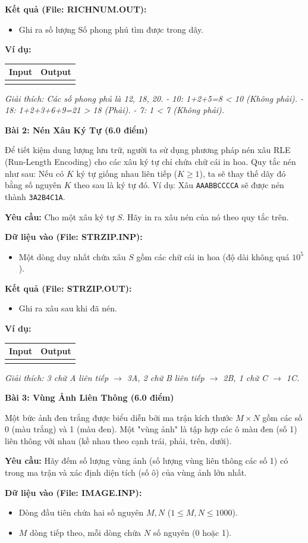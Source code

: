 \documentclass[11pt, a4paper]{article}
\newcommand{\bai}[2]{\vspace{0.5cm}\noindent\textbf{Bài #1: #2}}
\newcommand{\iobox}[2]{
    \begin{center}
    \begin{tabularx}{0.8\textwidth}{|X|X|}
    \hline
    \textbf{Input} & \textbf{Output} \\
    \hline
    \vtop{#1} & \vtop{#2} \\
    \hline
    \end{tabularx}
    \end{center}
}
\begin{document}
\textbf{Kết quả (File: RICHNUM.OUT):}
\begin{itemize}
    \item Ghi ra số lượng Số phong phú tìm được trong dãy.
\end{itemize}

\textbf{Ví dụ:}
\iobox{
5 \newline
12 10 18 20 7
}{
3
}
\textit{Giải thích: Các số phong phú là 12, 18, 20.
- 10: 1+2+5=8 < 10 (Không phải).
- 18: 1+2+3+6+9=21 > 18 (Phải).
- 7: 1 < 7 (Không phải).}

\bai{2}{Nén Xâu Ký Tự (6.0 điểm)}

Để tiết kiệm dung lượng lưu trữ, người ta sử dụng phương pháp nén xâu RLE (Run-Length Encoding) cho các xâu ký tự chỉ chứa chữ cái in hoa. Quy tắc nén như sau: Nếu có $K$ ký tự giống nhau liên tiếp ($K \ge 1$), ta sẽ thay thế dãy đó bằng số nguyên $K$ theo sau là ký tự đó.
Ví dụ: Xâu \texttt{AAABBCCCCA} sẽ được nén thành \texttt{3A2B4C1A}.

\textbf{Yêu cầu:} Cho một xâu ký tự $S$. Hãy in ra xâu nén của nó theo quy tắc trên.

\textbf{Dữ liệu vào (File: STRZIP.INP):}
\begin{itemize}
    \item Một dòng duy nhất chứa xâu $S$ gồm các chữ cái in hoa (độ dài không quá $10^5$).
\end{itemize}

\textbf{Kết quả (File: STRZIP.OUT):}
\begin{itemize}
    \item Ghi ra xâu sau khi đã nén.
\end{itemize}

\textbf{Ví dụ:}
\iobox{
AAABBC
}{
3A2B1C
}
\textit{Giải thích: 3 chữ A liên tiếp $\to$ 3A, 2 chữ B liên tiếp $\to$ 2B, 1 chữ C $\to$ 1C.}

\newpage

\bai{3}{Vùng Ảnh Liên Thông (6.0 điểm)}

Một bức ảnh đen trắng được biểu diễn bởi ma trận kích thước $M \times N$ gồm các số 0 (màu trắng) và 1 (màu đen). Một "vùng ảnh" là tập hợp các ô màu đen (số 1) liên thông với nhau (kề nhau theo cạnh trái, phải, trên, dưới).

\textbf{Yêu cầu:} Hãy đếm số lượng vùng ảnh (số lượng vùng liên thông các số 1) có trong ma trận và xác định diện tích (số ô) của vùng ảnh lớn nhất.

\textbf{Dữ liệu vào (File: IMAGE.INP):}
\begin{itemize}
    \item Dòng đầu tiên chứa hai số nguyên $M, N$ ($1 \le M, N \le 1000$).
    \item $M$ dòng tiếp theo, mỗi dòng chứa $N$ số nguyên (0 hoặc 1).
\end{itemize}
\end{document}
